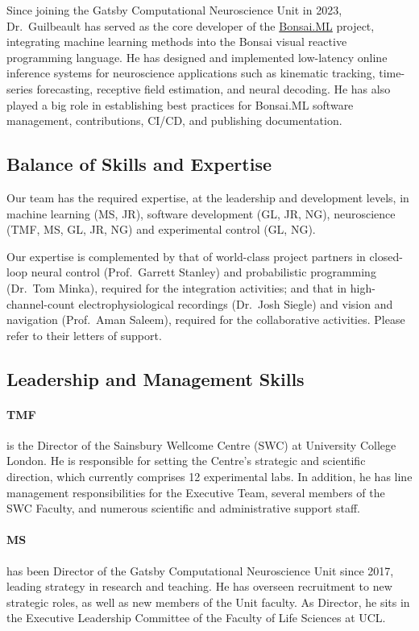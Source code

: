 Since joining the Gatsby Computational Neuroscience Unit in 2023, Dr.~Guilbeault has served as the core developer of the \href{https://bonsai-rx.org/machinelearning}{Bonsai.ML}
project, integrating machine learning methods into the Bonsai visual reactive programming language. He has designed and implemented low-latency online inference systems for neuroscience applications such as kinematic tracking, time-series forecasting, receptive field estimation, and neural decoding. He has also played a big role in establishing best practices for Bonsai.ML software management, contributions, CI/CD, and publishing documentation.

\subsection{Balance of Skills and Expertise}

Our team has the required expertise, at the leadership and development levels,
in machine learning (MS, JR), software development (GL, JR, NG), neuroscience
(TMF, MS, GL, JR, NG) and experimental control (GL, NG).

Our expertise is complemented by that of world-class project partners in
closed-loop neural control (Prof.~Garrett Stanley) and probabilistic programming
(Dr.~Tom Minka), required for the integration activities; and that in
high-channel-count electrophysiological recordings (Dr.~Josh Siegle) and vision
and navigation (Prof.~Aman Saleem), required for the collaborative activities.
Please refer to their letters of support.

\subsection{Leadership and Management Skills}

\paragraph{TMF} is the Director of the Sainsbury Wellcome Centre (SWC) at
University College London. He is responsible for setting the Centre’s strategic
and scientific direction, which currently comprises 12 experimental labs. In
addition, he has line management responsibilities for the Executive Team,
several members of the SWC Faculty, and numerous scientific and administrative
support staff.

\paragraph{MS} has been Director of the Gatsby Computational
Neuroscience Unit since 2017, leading strategy in research and teaching. He has overseen
recruitment to new strategic roles, as well as new members of the Unit faculty.
As Director, he sits in the Executive
Leadership Committee of the Faculty of Life Sciences at UCL.

